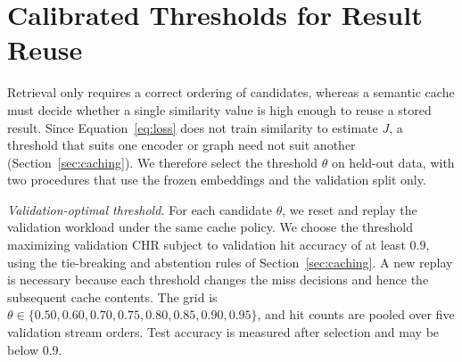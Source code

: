 \documentclass[runningheads]{llncs}
\begin{document}



\clearpage
\section{Calibrated Thresholds for Result Reuse}
\label{app:calibration}

Retrieval only requires a correct ordering of candidates, whereas a semantic
cache must decide whether a single similarity value is high enough to reuse a
stored result. Since Equation~\ref{eq:loss} does not train similarity to estimate $J$,
a threshold that suits one encoder or graph need not suit another
(Section~\ref{sec:caching}). We therefore select the threshold $\theta$ on
held-out data, with two procedures that use the frozen embeddings and the
validation split only.

\emph{Validation-optimal threshold.} For each candidate $\theta$, we reset
and replay the validation workload under the same cache policy. We choose the
threshold maximizing validation CHR subject to validation hit accuracy of at
least $0.9$, using the tie-breaking and abstention rules of
Section~\ref{sec:caching}. A new replay is necessary because each threshold
changes the miss decisions and hence the subsequent cache contents.
The grid is $\theta\in\{0.50,0.60,0.70,0.75,0.80,0.85,0.90,0.95\}$, and
hit counts are pooled over five validation stream orders. Test accuracy is measured after selection and may be below $0.9$.
\end{document}
